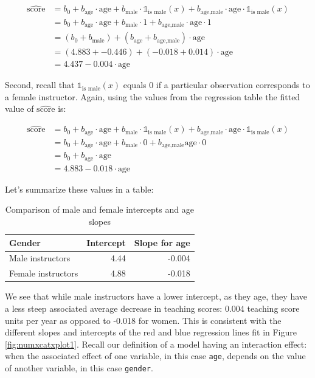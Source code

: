 \documentclass[12pt,]{krantz}
\theoremstyle{definition}
\theoremstyle{definition}
\theoremstyle{definition}
\theoremstyle{remark}
\begin{document}
\begin{align}
\widehat{\mbox{score}} &= b_0 + b_{\mbox{age}} \cdot \mbox{age} + b_{\mbox{male}} \cdot \mathbb{1}_{\mbox{is male}}(x) + b_{\mbox{age,male}} \cdot \mbox{age} \cdot \mathbb{1}_{\mbox{is male}}(x) \\
&= b_0 + b_{\mbox{age}} \cdot \mbox{age} + b_{\mbox{male}} \cdot 1 + b_{\mbox{age,male}} \cdot \mbox{age} \cdot 1 \\
&= \left(b_0 + b_{\mbox{male}}\right) + \left(b_{\mbox{age}} +  b_{\mbox{age,male}} \right) \cdot \mbox{age} \\
&= \left(4.883 + -0.446\right) + \left(-0.018 +  0.014 \right) \cdot \mbox{age} \\
&= 4.437 -0.004 \cdot \mbox{age}
\end{align}

Second, recall that \(\mathbb{1}_{\mbox{is male}}(x)\) equals 0 if a
particular observation corresponds to a female instructor. Again, using
the values from the regression table the fitted value of
\(\widehat{\mbox{score}}\) is:

\begin{align}
\widehat{\mbox{score}} &= b_0 + b_{\mbox{age}} \cdot \mbox{age} + b_{\mbox{male}} \cdot \mathbb{1}_{\mbox{is male}}(x) + b_{\mbox{age,male}} \cdot \mbox{age} \cdot \mathbb{1}_{\mbox{is male}}(x) \\
&= b_0 + b_{\mbox{age}} \cdot \mbox{age} + b_{\mbox{male}} \cdot 0 + b_{\mbox{age,male}}\mbox{age} \cdot 0 \\
&= b_0 + b_{\mbox{age}} \cdot \mbox{age}\\
&= 4.883 -0.018 \cdot \mbox{age}
\end{align}

Let's summarize these values in a table:

\begin{table}[H]

\caption{\label{tab:unnamed-chunk-254}Comparison of male and female intercepts and age slopes}
\centering
\fontsize{10}{12}\selectfont
\begin{tabular}[t]{lrr}
\toprule
Gender & Intercept & Slope for age\\
\midrule
Male instructors & 4.44 & -0.004\\
Female instructors & 4.88 & -0.018\\
\bottomrule
\end{tabular}
\end{table}

We see that while male instructors have a lower intercept, as they age,
they have a less steep associated average decrease in teaching scores:
0.004 teaching score units per year as opposed to -0.018 for women. This
is consistent with the different slopes and intercepts of the red and
blue regression lines fit in Figure \ref{fig:numxcatxplot1}. Recall our
definition of a model having an interaction effect: when the associated
effect of one variable, in this case \texttt{age}, depends on the value
of another variable, in this case \texttt{gender}.
\end{document}
